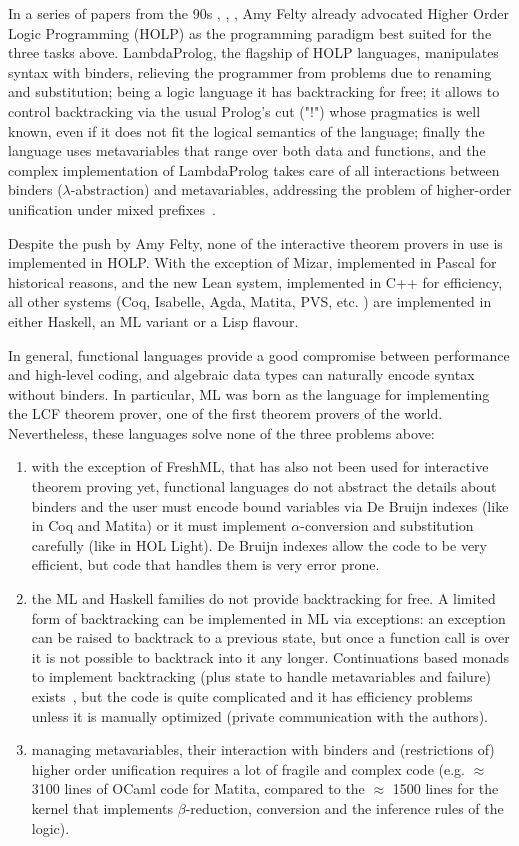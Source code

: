 \documentclass[preprint]{sigplanconf}
\begin{document}
In a series of papers from the 90s \cite{amy4}, \cite{amy3}, \cite{amy1}, Amy Felty already advocated Higher Order Logic Programming (HOLP) as the programming paradigm best suited for the three tasks above. LambdaProlog, the flagship of HOLP languages, manipulates syntax with binders, relieving the programmer from problems due to renaming and substitution; being a logic language it has backtracking for free; it allows to control backtracking via the usual Prolog's cut ("!") whose pragmatics is well known, even if it does not fit the logical semantics of the language; finally the language uses metavariables that range over both data and functions, and the complex implementation of LambdaProlog takes care of all interactions between binders ($\lambda$-abstraction) and metavariables, addressing the problem of higher-order unification under mixed prefixes~\cite{miller1}.

Despite the push by Amy Felty, none of the interactive theorem provers in use is implemented in HOLP. With the exception of Mizar, implemented in Pascal for historical reasons, and the new Lean system, implemented in C++ for efficiency, all other systems (Coq, Isabelle, Agda, Matita, PVS, etc. \cite{17thproversoftheworld}) are implemented in either Haskell, an ML variant or a Lisp flavour.

In general, functional languages provide a good compromise between performance and high-level coding, and algebraic data types can naturally encode syntax without binders. In particular, ML was born as the language for implementing the LCF theorem prover, one of the first theorem provers of the world. Nevertheless, these languages solve none of the three problems above:
\begin{enumerate}
\item with the exception of FreshML, that has also not been used for interactive theorem proving yet, functional languages do not abstract the details about binders and the user must encode bound variables via De Bruijn indexes (like in Coq and Matita) or it must implement $\alpha$-conversion and substitution carefully (like in HOL Light). De Bruijn indexes allow the code to be very efficient, but code that handles them is very error prone.
\item the ML and Haskell families do not provide backtracking for free. A limited form of backtracking can be implemented in ML via exceptions: an exception can be raised to backtrack to a previous state, but once a function call is over it is not possible to backtrack into it any longer. Continuations based monads to implement backtracking (plus state to handle metavariables and failure) exists~\cite{supermonad}, but the code is quite complicated and it has efficiency problems unless it is manually optimized (private communication with the authors).
\item managing metavariables, their interaction with binders and (restrictions of) higher order unification requires a lot of fragile and complex code (e.g. $\approx$ 3100 lines of OCaml code for Matita, compared to the $\approx$ 1500 lines for the kernel that implements $\beta$-reduction, conversion and the inference rules of the logic).
\end{enumerate}
\end{document}

